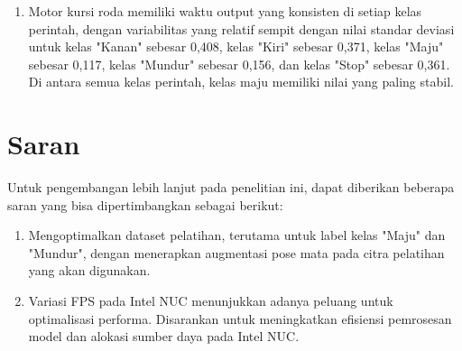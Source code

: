 \begin{enumerate}[nolistsep]
  \item Motor kursi roda memiliki waktu output yang konsisten di setiap kelas perintah, dengan variabilitas yang relatif sempit dengan nilai standar deviasi untuk kelas "Kanan" sebesar 0,408, kelas "Kiri" sebesar 0,371, kelas "Maju" sebesar 0,117, kelas "Mundur" sebesar 0,156, dan kelas "Stop" sebesar 0,361. Di antara semua kelas perintah, kelas maju memiliki nilai yang paling stabil.

\end{enumerate}

\section{Saran}
\label{chap:saran}

Untuk pengembangan lebih lanjut pada penelitian ini, dapat diberikan beberapa saran yang bisa dipertimbangkan sebagai berikut:

\begin{enumerate}[nolistsep]

  \item Mengoptimalkan dataset pelatihan, terutama untuk label kelas "Maju" dan "Mundur", dengan menerapkan augmentasi pose mata pada citra pelatihan yang akan digunakan.
  
  \item Variasi FPS pada Intel NUC menunjukkan adanya peluang untuk optimalisasi performa. Disarankan untuk meningkatkan efisiensi pemrosesan model dan alokasi sumber daya pada Intel NUC.

\end{enumerate}